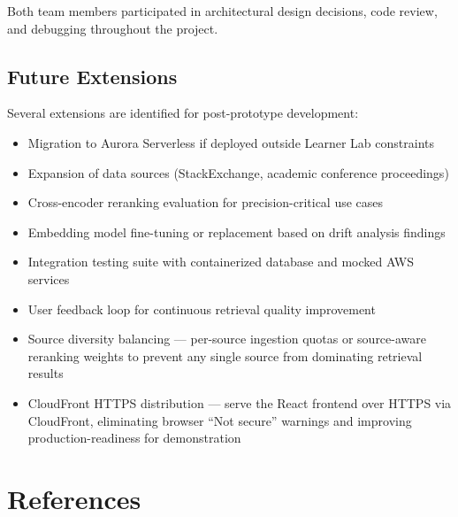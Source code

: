 \documentclass[12pt,a4paper]{report}
\begin{document}
Both team members participated in architectural design decisions, code review, and debugging throughout the project.

\section{Future Extensions}
\label{sec:future}

Several extensions are identified for post-prototype development:

\begin{itemize}[leftmargin=0.5in]
  \item Migration to Aurora Serverless if deployed outside Learner Lab constraints
  \item Expansion of data sources (StackExchange, academic conference proceedings)
  \item Cross-encoder reranking evaluation for precision-critical use cases
  \item Embedding model fine-tuning or replacement based on drift analysis findings
  \item Integration testing suite with containerized database and mocked AWS services
  \item User feedback loop for continuous retrieval quality improvement
  \item Source diversity balancing --- per-source ingestion quotas or source-aware reranking weights to prevent any single source from dominating retrieval results
  \item CloudFront HTTPS distribution --- serve the React frontend over HTTPS via CloudFront, eliminating browser ``Not secure'' warnings and improving production-readiness for demonstration
\end{itemize}

\chapter*{References}
\end{document}

